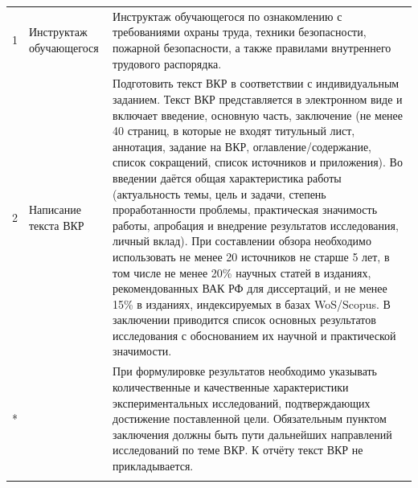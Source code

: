 \begin{longtable}{|c|p{5.5cm}|p{8.5cm}|}
	1          & Инструктаж обучающегося                    &
	Инструктаж обучающегося по ознакомлению с требованиями охраны труда, техники безопасности, пожарной безопасности, а также правилами внутреннего трудового распорядка.                                                                                                                                                                                                                                                                                                                                                                                                                                                                                                                                                                                                                                                                                                                                                  \\ \hhline{|-|-|-|}

	2          & Написание текста ВКР                       &
	Подготовить текст ВКР в соответствии с индивидуальным заданием. Текст ВКР представляется в электронном виде и включает введение, основную часть, заключение (не менее 40 страниц, в которые не входят титульный лист, аннотация, задание на ВКР, оглавление/содержание, список сокращений, список источников и приложения). Во введении даётся общая характеристика работы (актуальность темы, цель и задачи, степень проработанности проблемы, практическая значимость работы, апробация и внедрение результатов исследования, личный вклад). При составлении обзора необходимо использовать не менее 20 источников не старше 5 лет, в том числе не менее 20\% научных статей в изданиях, рекомендованных ВАК РФ для диссертаций, и не менее 15\% в изданиях, индексируемых в базах WoS/Scopus. В заключении приводится список основных результатов исследования с обоснованием их научной и практической значимости. \\* \cline{3-3}
	           &                                            &
	При формулировке результатов необходимо указывать количественные и качественные характеристики экспериментальных исследований, подтверждающих достижение поставленной цели. Обязательным пунктом заключения должны быть пути дальнейших направлений исследований по теме ВКР. К отчёту текст ВКР не прикладывается.                                                                                                                                                                                                                                                                                                                                                                                                                                                                                                                                                                                                    \\ \hhline{|-|-|-|}


\end{longtable}
